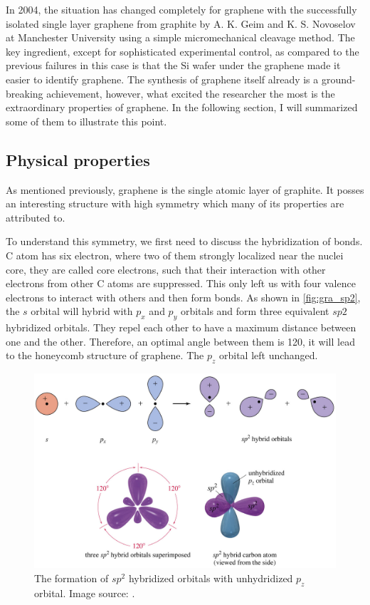 In 2004, the situation has changed completely for graphene with the successfully isolated single layer graphene from graphite by A. K. Geim and K. S. Novoselov at Manchester University using a simple micromechanical cleavage method. The key ingredient, except for sophisticated experimental control, as compared to the previous failures\cite{Krishnan1997,Ohashi1997} in this case is that the Si wafer under the graphene made it easier to identify graphene\cite{Geim2007}. The synthesis of graphene itself already is a ground-breaking achievement, however, what excited the researcher the most is the extraordinary properties of graphene. In the following section, I will summarized some of them to illustrate this point.

\subsection{Physical properties}

As mentioned previously, graphene is the single atomic layer of graphite. It posses an interesting structure with high symmetry which many of its properties are attributed to. 

To understand this symmetry, we first need to discuss the hybridization of bonds. C atom has six electron, where two of them strongly localized near the nuclei core, they are called core electrons, such that their interaction with other electrons from other C atoms are suppressed. This only left us with four valence electrons to interact with others and then form bonds. As shown in \autoref{fig:gra_sp2}, the $s$ orbital will hybrid with $p_x$ and $p_y$ orbitals and form three equivalent $sp2$ hybridized orbitals. They repel each other to have a maximum distance between one and the other. Therefore, an optimal angle between them is 120\textdegree, it will lead to the honeycomb structure of graphene. The $p_z$ orbital left unchanged. 

\begin{figure}[htbp!] 
\centering  
\includegraphics[width=\textwidth]{sphybird}
\caption{The formation of $sp^2$ hybridized orbitals with unhydridized $p_z$ orbital. Image source: \cite{gra_sp2}. }  
\label{fig:gra_sp2}
\end{figure} 

